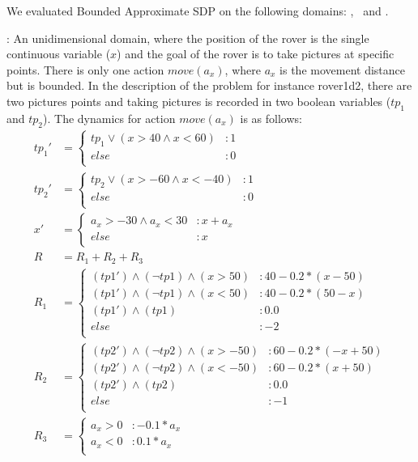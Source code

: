 We evaluated Bounded Approximate SDP on the following domains:
\MarsRoverUni, \MarsRoverBi ~and \Invent.

\MarsRoverUni:
An unidimensional domain, where the position of the rover is the single continuous variable ($x$) and the goal of the rover is to take pictures at specific points. There is only one action $ move(a_x)$, where $a_x$ is the movement distance but is bounded. In the description of the problem for instance rover1d2, there are two pictures points and taking pictures is recorded in two boolean variables ($tp_1$ and $tp_2$). The dynamics for action $move(a_x)$ is as follows:
{\scriptsize
\begin{align*}
tp_1' &= \begin{cases}
tp_1 \vee (x>40 \wedge x<60)&: 1\\
else&: 0\\
\end{cases}\\
tp_2' &= \begin{cases}
tp_2 \vee (x>-60 \wedge x<-40)&: 1\\
else&: 0\\
\end{cases}\\
x' &= \begin{cases}
a_x>-30 \wedge a_x<30&: x +a_x\\
else&: x\\
\end{cases}\\
R & = R_1 + R_2 + R_3\\
R_1 & = \begin{cases} 
(tp1') \wedge (\neg tp1) \wedge (x > 50) &: 40 - 0.2*(x -50)\\
(tp1') \wedge (\neg tp1) \wedge (x < 50) &: 40 - 0.2*(50-x)\\
(tp1') \wedge ( tp1) &:  0.0\\
else &: -2\\
\end{cases} \\
R_2 & = \begin{cases} 
(tp2') \wedge (\neg tp2) \wedge (x > -50) &: 60 - 0.2*(-x +50)\\
(tp2') \wedge (\neg tp2) \wedge (x < -50) &: 60 - 0.2*(x +50)\\
(tp2') \wedge ( tp2) &:  0.0\\
else &: -1\\
\end{cases} \\
R_3 & = \begin{cases} 
a_x > 0 &: -0.1*a_x\\
a_x < 0 &: 0.1*a_x\\
\end{cases} \\
\end{align*} }

